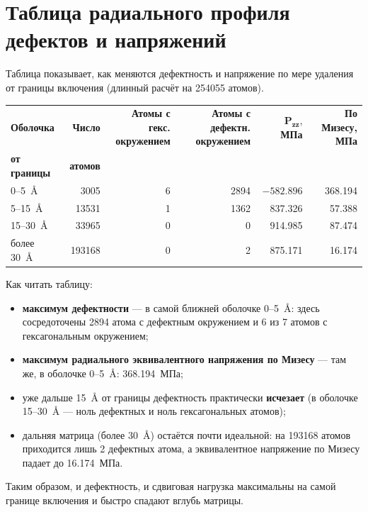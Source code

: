 \documentclass[12pt,a4paper]{extarticle}
\newcommand{\hh}[1]{\small\textbf{#1}}
\begin{document}
\section{Таблица радиального профиля дефектов и напряжений}
Таблица показывает, как меняются дефектность и напряжение по мере удаления от границы включения (длинный расчёт на 254055 атомов).

\smallskip
\begin{center}
\small
\setlength{\tabcolsep}{6pt}
\renewcommand{\arraystretch}{1.25}
\begin{tabular}{l r r r r r}
\toprule
\hh{Оболочка}     & \hh{Число}  & \shortstack[r]{\hh{Атомы с гекс.}\\\hh{окружением}} & \shortstack[r]{\hh{Атомы с дефектн.}\\\hh{окружением}} & \shortstack[r]{$\mathbf{P_{zz}}$,\\\hh{МПа}} & \shortstack[r]{\hh{По Мизесу,}\\\hh{МПа}} \\
\hh{от границы}    & \hh{атомов} & & & & \\
\midrule
0--5~Å        & 3005   & 6 & 2894 & $-582.896$ & 368.194 \\
5--15~Å       & 13531  & 1 & 1362 & 837.326    & 57.388  \\
15--30~Å      & 33965  & 0 & 0    & 914.985    & 87.474  \\
более 30~Å    & 193168 & 0 & 2    & 875.171    & 16.174  \\
\bottomrule
\end{tabular}
\end{center}

\smallskip
\noindent Как читать таблицу:
\begin{itemize}[leftmargin=1.4em,itemsep=2pt,topsep=2pt]
\item \textbf{максимум дефектности} — в самой ближней оболочке 0--5~Å: здесь сосредоточены 2894 атома с дефектным окружением и 6 из 7 атомов с гексагональным окружением;
\item \textbf{максимум радиального эквивалентного напряжения по Мизесу} — там же, в оболочке 0--5~Å: 368.194~МПа;
\item уже дальше 15~Å от границы дефектность практически \textbf{исчезает} (в оболочке 15--30~Å — ноль дефектных и ноль гексагональных атомов);
\item дальняя матрица (более 30~Å) остаётся почти идеальной: на 193168 атомов приходится лишь 2 дефектных атома, а эквивалентное напряжение по Мизесу падает до 16.174~МПа.
\end{itemize}
Таким образом, и дефектность, и сдвиговая нагрузка максимальны на самой границе включения и быстро спадают вглубь матрицы.
\end{document}
